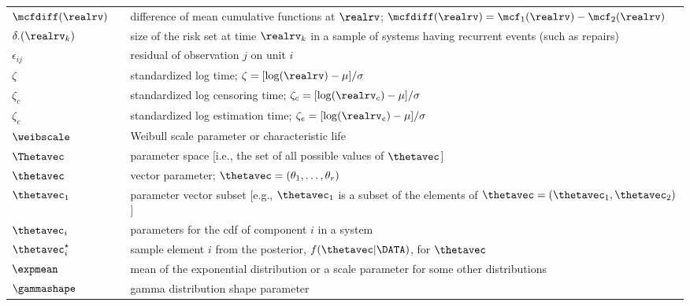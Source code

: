\begin{supertabular}{p{0.9in}lp{4.0in}}
$\mcfdiff(\realrv)$       & 
&
difference of mean cumulative
functions at $\realrv$; 
$
\mcfdiff(\realrv)=\mcf_{1}(\realrv)-\mcf_{2}(\realrv)
$
   \\
$\delta_{\cdot}(\realrv_{k})$ & 
     &
size of the risk set at time $\realrv_{k}$
in a sample of systems having recurrent events (such as repairs)
   \\
$\epsilon_{ij}$ &
&residual of  observation $j$ on unit $i$
   \\
$\zeta$ & 
& standardized log time; $\zeta=[\log(\realrv)-\mu]/\sigma$ 
\\
$\zeta_{c}$   & 
&standardized log censoring time;
$\zeta_{c}=[\log(\realrv_{c})-\mu]/\sigma$
\\
$\zeta_{e}$   & 
&standardized log estimation time;
$\zeta_{e}=[\log(\realrv_{e})-\mu]/\sigma$
   \\
$\weibscale$ &
& Weibull scale parameter or characteristic life
\\
$\Thetavec$ &
& parameter space 
[i.e., the set of all possible values of $\thetavec$]
   \\
$\thetavec$ & 
&vector  parameter; $\thetavec=(\theta_{1},\dots,\theta_{r})$
   \\
$\thetavec_{1}$ & 
&parameter vector subset [e.g., $\thetavec_{1}$
is a subset of the elements of  $\thetavec=(\thetavec_{1},\thetavec_{2})$]
   \\
$\thetavec_{i}$ & 
&parameters for the cdf of component $i$
in a system
    \\
$\thetavec_{i}^{\star}$ & 
&
sample element $i$ from  the posterior,
$f(\thetavec | \DATA)$, for $\thetavec$
   \\
$\expmean$ & 
&mean of the exponential distribution or a scale parameter for some
other distributions
     \\
$\gammashape$ & 
&gamma distribution shape parameter 
    \\

\end{supertabular}
